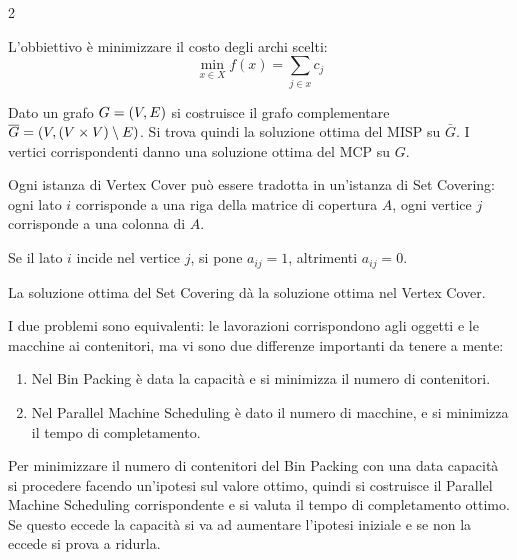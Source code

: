 \documentclass[\main/main.tex]{subfiles}
\begin{document}
\begin{multicols}{2}
\begin{definition}
\begin{enumerate}
        \end{enumerate}
    \end{definition}
    \begin{definition}
        L'obbiettivo è minimizzare il costo degli archi scelti:
        \[
            \min_{x \in X} f(x) = \sum_{j \in x} c_j
        \]
    \end{definition}
    \begin{observation}
        Dato un grafo \(G = \left(V, E\right)\) si costruisce il grafo complementare \(\overline{G} = \left(V, \left(V \times V\right) \setminus E\right)\). Si trova quindi la soluzione ottima del MISP su \(\bar{G}\). I vertici corrispondenti danno una soluzione ottima del MCP su \(G\).
    \end{observation}
    \begin{observation}
        Ogni istanza di Vertex Cover può essere tradotta in un'istanza di Set Covering: ogni lato \(i\) corrisponde a una riga della matrice di copertura \(A\), ogni vertice \(j\) corrisponde a una colonna di \(A\).
        
        Se il lato \(i\) incide nel vertice \(j\), si pone \(a_{ij} = 1\), altrimenti \(a_{ij}=0\). 
        
        La soluzione ottima del Set Covering dà la soluzione ottima nel Vertex Cover.
    \end{observation}
    \begin{observation}
        I due problemi sono equivalenti: le lavorazioni corrispondono agli oggetti e le macchine ai contenitori, ma vi sono due differenze importanti da tenere a mente:
        \begin{enumerate}
            \item Nel Bin Packing è data la capacità e si minimizza il numero di contenitori.
            \item Nel Parallel Machine Scheduling è dato il numero di macchine, e si minimizza il tempo di completamento.
        \end{enumerate}
        Per minimizzare il numero di contenitori del Bin Packing con una data capacità si procedere facendo un'ipotesi sul valore ottimo, quindi si costruisce il Parallel Machine Scheduling corrispondente e si valuta il tempo di completamento ottimo. Se questo eccede la capacità si va ad aumentare l'ipotesi iniziale e se non la eccede si prova a ridurla.
    \end{observation}
\end{multicols}
\end{document}
